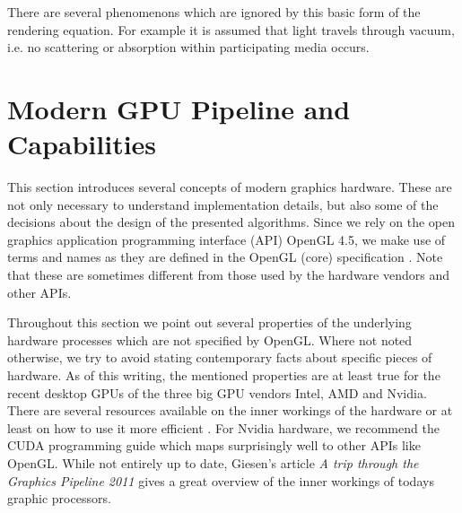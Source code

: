 \documentclass[thesis.tex]{subfiles}
\begin{document}
There are several phenomenons which are ignored by this basic form of the rendering equation.
For example it is assumed that light travels through vacuum, i.e. no scattering or absorption within participating media occurs.



\section{Modern GPU Pipeline and Capabilities}
This section introduces several concepts of modern graphics hardware.
These are not only necessary to understand implementation details, but also some of the decisions about the design of the presented algorithms.
Since we rely on the open graphics application programming interface (API) OpenGL 4.5, we make use of terms and names as they are defined in the OpenGL (core) specification \cite{bib:openglspec}.
Note that these are sometimes different from those used by the hardware vendors and other APIs.

Throughout this section we point out several properties of the underlying hardware processes which are not specified by OpenGL.
Where not noted otherwise, we try to avoid stating contemporary facts about specific pieces of hardware.
As of this writing, the mentioned properties are at least true for the recent desktop GPUs of the three big GPU vendors Intel, AMD and Nvidia.
There are several resources available on the inner workings of the hardware or at least on how to use it more efficient \cite{bib:intelhardwaredoc, bib:amdhardwaredoc}.
For Nvidia hardware, we recommend the CUDA programming guide \cite{bib:cudaprogguide} which maps surprisingly well to other APIs like OpenGL.
While not entirely up to date, Giesen's article \emph{A trip through the Graphics Pipeline 2011} \cite{bib:tripthroughgraphicspipe} gives a great overview of the inner workings of todays graphic processors.

\end{document}
